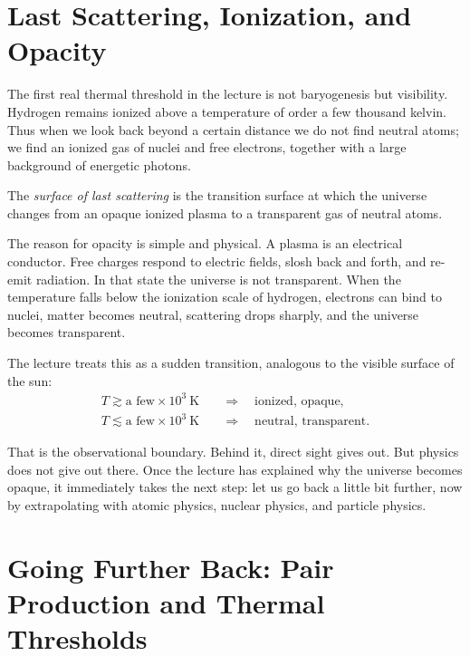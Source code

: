 \section{Last Scattering, Ionization, and Opacity}

The first real thermal threshold in the lecture is not baryogenesis but visibility. Hydrogen remains ionized above a temperature of order a few thousand kelvin. Thus when we look back beyond a certain distance we do not find neutral atoms; we find an ionized gas of nuclei and free electrons, together with a large background of energetic photons.

\begin{definition}
The \emph{surface of last scattering} is the transition surface at which the universe changes from an opaque ionized plasma to a transparent gas of neutral atoms.
\end{definition}

The reason for opacity is simple and physical. A plasma is an electrical conductor. Free charges respond to electric fields, slosh back and forth, and re-emit radiation. In that state the universe is not transparent. When the temperature falls below the ionization scale of hydrogen, electrons can bind to nuclei, matter becomes neutral, scattering drops sharply, and the universe becomes transparent.

The lecture treats this as a sudden transition, analogous to the visible surface of the sun:
\begin{align}
T \gtrsim \text{a few}\times 10^3\ \mathrm{K} &\quad \Longrightarrow \quad \text{ionized, opaque},\\
T \lesssim \text{a few}\times 10^3\ \mathrm{K} &\quad \Longrightarrow \quad \text{neutral, transparent}.
\end{align}

That is the observational boundary. Behind it, direct sight gives out. But physics does not give out there. Once the lecture has explained why the universe becomes opaque, it immediately takes the next step: let us go back a little bit further, now by extrapolating with atomic physics, nuclear physics, and particle physics.

\section{Going Further Back: Pair Production and Thermal Thresholds}

